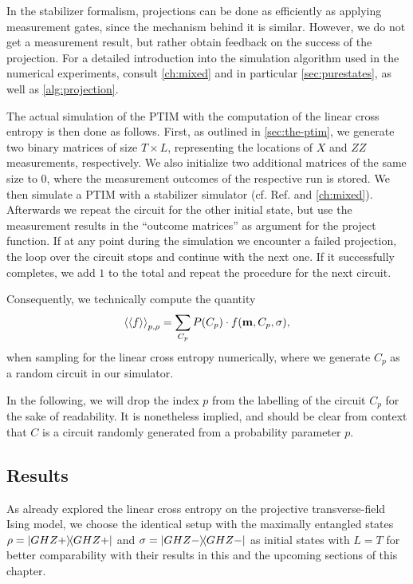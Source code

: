 In the stabilizer
formalism, projections can be done as efficiently as applying measurement
gates,
since the mechanism behind it is similar. However, we do not get a measurement
result, but rather obtain feedback on the success of the projection.
For a detailed introduction into the
simulation algorithm used in the numerical experiments, consult \cref{ch:mixed}
and in particular \cref{sec:purestates}, as well as \cref{alg:projection}.

The actual simulation of the PTIM with the computation of the linear cross
entropy is then done as follows. First, as outlined in \cref{sec:the-ptim},
we generate two binary matrices of size $T\times L$, representing the
locations of $X$ and $ZZ$ measurements, respectively. We also initialize two
additional matrices of the same size to 0, where the measurement outcomes of
the respective run is stored. We then simulate a PTIM with a stabilizer
simulator (cf. Ref. \cite{langCliffordCircuitSimulator2022} and
\cref{ch:mixed}). Afterwards we repeat the
circuit for the other initial state, but use the measurement results in the
\enquote{outcome matrices} as argument for the project function. If at any
point during the simulation we encounter a failed projection, the loop over the
circuit stops and continue with the next one. If it successfully completes, we
add $1$ to the total and repeat the procedure for the next circuit.

Consequently, we technically compute the quantity
\begin{align}\label{eq:sample-f-C}
  \expval{\expval{f}}_{p,\rho} = \sum_{C_p} P(C_p) \cdot f(\mathbf{m},C_p,
  \sigma)
,\end{align}
when sampling for the linear cross entropy numerically, where we generate $C_p$
as a random circuit in our simulator. 

In the following, we will drop the index $p$ from the labelling of the circuit
$C_p$ for the sake of readability. It is nonetheless implied, and should be
clear from context that $C$ is a circuit randomly generated from a probability
parameter $p$.

\subsection{Results}

As \cite{tikhanovskayaUniversalityCrossEntropy2023} already explored
the linear cross entropy on the projective transverse-field Ising model, we
choose the identical setup with the maximally entangled states $\rho = \dyad{GHZ+}$ and
$\sigma = \dyad{GHZ-}$ as initial states with $L=T$ for better comparability
with their results in this and the upcoming sections of this chapter.


